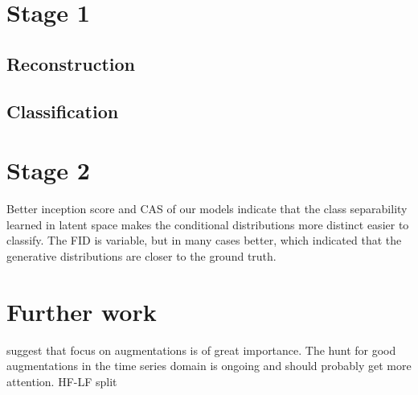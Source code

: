 \documentclass[../../thesis.tex]{subfiles}
\begin{document}
\section{Stage 1}

\subsection{Reconstruction}



\subsection{Classification}
\section{Stage 2}

Better inception score and CAS of our models indicate that the class separability learned in latent space makes the conditional distributions more distinct easier to classify. The FID is variable, but in many cases better, which indicated that the generative distributions are closer to the ground truth.

\section{Further work}
\cite{morningstar2024augmentations} suggest that focus on augmentations is of great importance. The hunt for good augmentations in the time series domain is ongoing and should probably get more attention.\newline
HF-LF split
\end{document}
